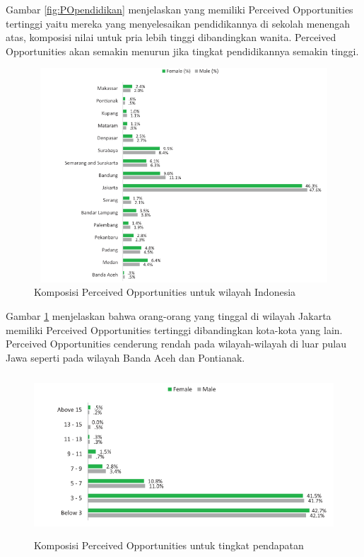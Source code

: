 Gambar \ref{fig:POpendidikan} menjelaskan yang memiliki Perceived Opportunities tertinggi yaitu mereka yang menyelesaikan pendidikannya di sekolah menengah atas, komposisi nilai untuk pria lebih tinggi dibandingkan wanita. Perceived Opportunities akan semakin menurun jika tingkat pendidikannya semakin tinggi.

\begin{figure} [H]
	\centering  
	\includegraphics[width=13cm, height=8cm]{lokasiPO2013} 
	\caption[Komposisi Perceived Opportunities untuk wilayah Indonesia]{Komposisi Perceived Opportunities untuk wilayah Indonesia} 
	\label{fig:lokasiPO} 
\end{figure}  

Gambar \ref{fig:lokasiPO} menjelaskan bahwa orang-orang yang tinggal di wilayah Jakarta memiliki Perceived Opportunities tertinggi dibandingkan kota-kota yang lain. Perceived Opportunities cenderung rendah pada wilayah-wilayah di luar pulau Jawa seperti pada wilayah Banda Aceh dan Pontianak.

\begin{figure} [H]
	\centering  
	\includegraphics[width=13cm, height=6cm]{pendapatanPO2013} 
	\caption[Komposisi Perceived Opportunities untuk tingkat pendapatan]{Komposisi Perceived Opportunities untuk tingkat pendapatan} 
	\label{fig:pendapatanPO} 
\end{figure} 

